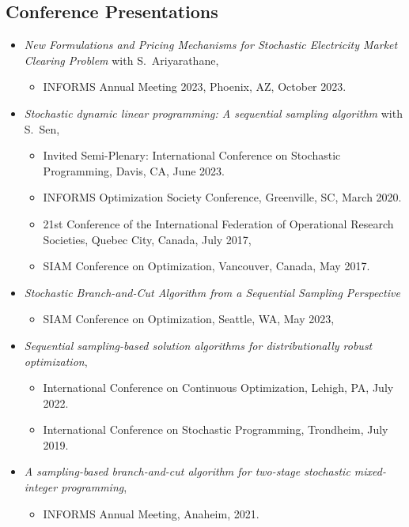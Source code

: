 \documentclass[hyperref, margin]{myResume}
\begin{document}
\begin{resume}
\section{Conference Presentations}
	\begin{itemize}[leftmargin=*]
		\item \textit{New Formulations and Pricing Mechanisms for Stochastic Electricity Market Clearing Problem} with S.\ Ariyarathane,
		\begin{itemize}
			\item INFORMS Annual Meeting 2023, Phoenix, AZ, October 2023.
		\end{itemize}		
		\item \textit{Stochastic dynamic linear programming: A sequential sampling algorithm} with S.\ Sen, 
		\begin{itemize} [leftmargin=1em]
			\item Invited Semi-Plenary: International Conference on Stochastic Programming, Davis, CA, June 2023.
			\item INFORMS Optimization Society Conference, Greenville, SC, March 2020.
			\item 21st Conference of the International Federation of Operational Research Societies, Quebec City, Canada, July 2017,
			\item SIAM Conference on Optimization, Vancouver, Canada, May 2017.
		\end{itemize}
		\item \textit{Stochastic Branch-and-Cut Algorithm from a Sequential Sampling Perspective}
		\begin{itemize}
			\item SIAM Conference on Optimization, Seattle, WA, May 2023,
		\end{itemize}
		\item \textit{Sequential sampling-based solution algorithms for distributionally robust optimization},
		\begin{itemize}
			\item International Conference on Continuous Optimization, Lehigh, PA, July 2022.
			\item International Conference on Stochastic Programming, Trondheim, July 2019.
		\end{itemize}
		\item \textit{A sampling-based branch-and-cut algorithm for two-stage stochastic mixed-integer programming},
		\begin{itemize}
			\item INFORMS Annual Meeting, Anaheim, 2021.

\end{itemize}
\end{itemize}
\end{resume}
\end{document}
